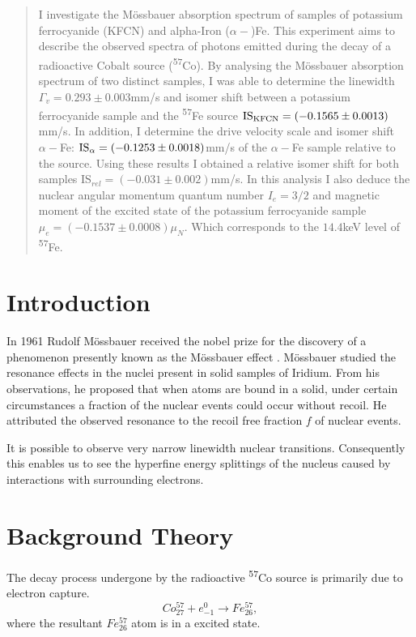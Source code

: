 \documentclass[a4paper, twocolumn]{article}
\title{
    
}
\author{Ana C. Fabela Hinojosa \\
\small{School of Physics and Astronomy, Monash University}}
\date{Last edit: \today}
\begin{document}
\maketitle

\begin{abstract}
I investigate the Mössbauer absorption spectrum of samples of potassium ferrocyanide (KFCN) and alpha-Iron ($\alpha-$)Fe. 
This experiment aims to describe the observed spectra of photons emitted during the decay of a radioactive Cobalt source (\textsuperscript{57}Co).
By analysing the Mössbauer absorption spectrum of two distinct samples, I was able to determine the linewidth $\Gamma_v = 0.293\pm0.003$mm/s and isomer shift between a potassium ferrocyanide sample and the \textsuperscript{57}Fe source $\textrm{IS}_{\rm KFCN} = (-0.1565\pm0.0013)$mm/s. In addition, I determine the drive velocity scale and isomer shift $\alpha-$Fe: $\textrm{IS}_{\rm \alpha} = (-0.1253\pm0.0018)$mm/s of the $\alpha-$Fe sample relative to the source. Using these results I obtained a relative isomer shift for both samples $\textrm{IS}_{rel} = (-0.031\pm0.002)$mm/s.
In this analysis I also deduce the nuclear angular momentum quantum number $I_e = 3/2$ and magnetic moment of the excited state of the potassium ferrocyanide sample $\mu_e = (-0.1537\pm0.0008)\mu_N$. Which corresponds to the $14.4$keV level of \textsuperscript{57}Fe.
\end{abstract}




\section{Introduction}
In 1961 Rudolf Mössbauer received the nobel prize for the discovery of a phenomenon presently known as the Mössbauer effect \cite{2}.
Mössbauer studied the resonance effects in the nuclei present in solid samples of Iridium. From his observations, he proposed that when atoms are bound in a solid, under certain circumstances a fraction of the nuclear events could occur without recoil. He attributed the observed resonance to the recoil free fraction $f$ of nuclear events\cite{0}.

It is possible to observe very narrow linewidth nuclear transitions. Consequently this enables us  to see the hyperfine energy splittings of the nucleus caused by interactions with surrounding electrons\cite{0}. 

\section{Background Theory}
The decay process undergone by the radioactive \textsuperscript{57}Co source is primarily due to electron capture\cite{0}.
\begin{equation} Co^{57}_{27} + e^{0}_{-1} \rightarrow Fe^{57}_{26},
\end{equation}
where the resultant $Fe^{57}_{26}$ atom is in a excited state.
\end{document}
